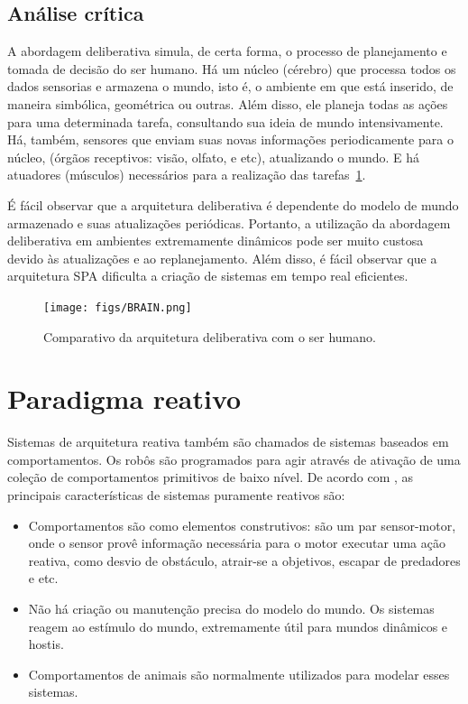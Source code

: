 \subsection{Análise crítica}
A abordagem deliberativa simula, de certa forma, o processo de planejamento e
tomada de decisão do ser humano. Há um núcleo (cérebro) que
processa todos os dados sensorias e armazena o mundo, isto é, o ambiente em que
está inserido, de maneira simbólica, geométrica ou outras.
Além disso, ele planeja todas as ações para uma determinada tarefa, consultando sua ideia de mundo intensivamente. Há,
também, sensores que enviam suas novas informações periodicamente para o núcleo,
(órgãos receptivos: visão, olfato, e etc), atualizando o mundo. E há
atuadores (músculos) necessários para a realização das tarefas~\ref{brain}.

É fácil observar que a arquitetura deliberativa é dependente do
modelo de mundo armazenado e suas atualizações periódicas. Portanto, a
utilização da abordagem deliberativa em ambientes extremamente dinâmicos pode ser muito
custosa devido às atualizações e ao replanejamento. Além disso, é fácil observar
que a arquitetura SPA dificulta a criação de sistemas em tempo real eficientes.

\begin{figure}[H]
\centering
\texttt{[image: figs/BRAIN.png]}
\caption{Comparativo da arquitetura deliberativa com o ser humano.}
\label{brain}
\end{figure}

\section{Paradigma reativo}

Sistemas de arquitetura reativa também são chamados de sistemas baseados em
comportamentos. Os robôs são programados para agir através de ativação de uma
coleção de comportamentos primitivos de baixo nível. De acordo com
\cite{arkin1995reactive}, as principais características de sistemas puramente
reativos são:

\begin{itemize}
  \item Comportamentos são como elementos construtivos: são um par sensor-motor,
  onde o sensor provê informação necessária para o motor executar uma ação
  reativa, como desvio de obstáculo, atrair-se a objetivos, escapar de
  predadores e etc.
  \item Não há criação ou manutenção precisa do modelo do mundo. Os sistemas
  reagem ao estímulo do mundo, extremamente útil para mundos dinâmicos e
  hostis.
  \item Comportamentos de animais são normalmente utilizados para modelar esses
  sistemas.
\end{itemize}

